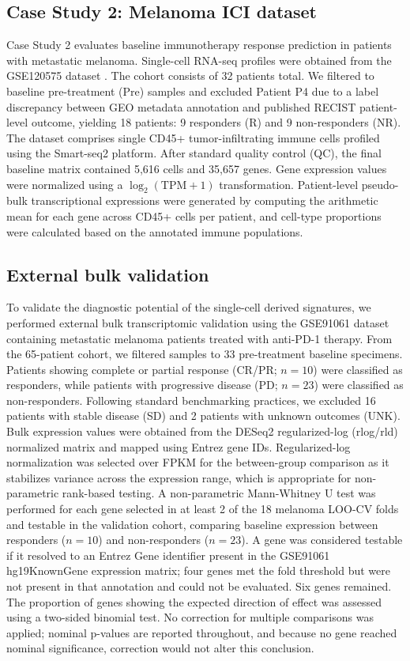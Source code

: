 \documentclass{bmcart}
\begin{document}
\subsection*{Case Study 2: Melanoma ICI dataset}
Case Study 2 evaluates baseline immunotherapy response prediction in patients with metastatic melanoma. Single-cell RNA-seq profiles were obtained from the GSE120575 dataset \cite{sadefeldman}. The cohort consists of 32 patients total. We filtered to baseline pre-treatment (Pre) samples and excluded Patient P4 due to a label discrepancy between GEO metadata annotation and published RECIST patient-level outcome, yielding 18 patients: 9 responders (R) and 9 non-responders (NR). The dataset comprises single CD45+ tumor-infiltrating immune cells profiled using the Smart-seq2 platform. After standard quality control (QC), the final baseline matrix contained 5,616 cells and 35,657 genes. Gene expression values were normalized using a $\log_2(\text{TPM}+1)$ transformation. Patient-level pseudo-bulk transcriptional expressions were generated by computing the arithmetic mean for each gene across CD45+ cells per patient, and cell-type proportions were calculated based on the annotated immune populations.

\subsection*{External bulk validation}
To validate the diagnostic potential of the single-cell derived signatures, we performed external bulk transcriptomic validation using the GSE91061 dataset \cite{riaz} containing metastatic melanoma patients treated with anti-PD-1 therapy. From the 65-patient cohort, we filtered samples to 33 pre-treatment baseline specimens. Patients showing complete or partial response (CR/PR; $n=10$) were classified as responders, while patients with progressive disease (PD; $n=23$) were classified as non-responders. Following standard benchmarking practices, we excluded 16 patients with stable disease (SD) and 2 patients with unknown outcomes (UNK). Bulk expression values were obtained from the DESeq2 regularized-log (rlog/rld) normalized matrix and mapped using Entrez gene IDs. Regularized-log normalization was selected over FPKM for the between-group comparison as it stabilizes variance across the expression range, which is appropriate for non-parametric rank-based testing. A non-parametric Mann-Whitney U test was performed for each gene selected in at least 2 of the 18 melanoma LOO-CV folds and testable in the validation cohort, comparing baseline expression between responders ($n = 10$) and non-responders ($n = 23$). A gene was considered testable if it resolved to an Entrez Gene identifier present in the GSE91061 hg19KnownGene expression matrix; four genes met the fold threshold but were not present in that annotation and could not be evaluated. Six genes remained. The proportion of genes showing the expected direction of effect was assessed using a two-sided binomial test. No correction for multiple comparisons was applied; nominal p-values are reported throughout, and because no gene reached nominal significance, correction would not alter this conclusion.
\end{document}

